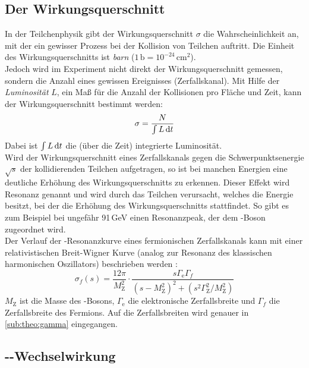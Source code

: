 \subsection{Der Wirkungsquerschnitt}
In der Teilchenphysik gibt der Wirkungsquerschnitt $\sigma$ die Wahrscheinlichkeit an, mit der ein gewisser Prozess bei der Kollision von 
Teilchen auftritt.
Die Einheit des Wirkungsquerschnitts ist \emph{barn} ($1\,\text{b} = 10^{-24}\,\text{cm}^2$). \\
Jedoch wird im Experiment nicht direkt der Wirkungsquerschnitt gemessen, sondern die Anzahl eines gewissen Ereignisses (Zerfallskanal). Mit Hilfe
der \emph{Luminosität} $L$, ein Maß für die Anzahl der Kollisionen pro Fläche und Zeit, kann der Wirkungsquerschnitt bestimmt werden:
\begin{equation}
    \sigma = \frac{N}{\int L \, \mathrm{d} t}
\end{equation}
Dabei ist $\int L \, \mathrm{d} t$ die (über die Zeit) integrierte Luminosität. \\
Wird der Wirkungsquerschnitt eines Zerfallskanals gegen die Schwerpunktsenergie $\sqrt{s}$ der kollidierenden Teilchen aufgetragen, so ist
bei manchen Energien eine deutliche Erhöhung des Wirkungsquerschnitts zu erkennen. Dieser Effekt wird Resonanz genannt und wird durch das Teilchen
verursacht, welches die Energie besitzt, bei der die Erhöhung des Wirkungsquerschnitts stattfindet.
So gibt es zum Beispiel bei ungefähr 91\,GeV einen Resonanzpeak, der dem \Z-Boson zugeordnet wird. \\
Der Verlauf der  \Z-Resonanzkurve eines fermionischen Zerfallskanals kann mit einer relativistischen Breit-Wigner Kurve (analog zur Resonanz des
klassischen harmonischen Oszillators) beschrieben werden \cite{manual}:
\begin{equation}
    \label{eq:sigma:fermion}
    \sigma_f(s) = \frac{12 \pi}{M_\text{Z}^2} \cdot \frac{s \Gamma_\text{e} \Gamma_f}{ \left( s - M_\text{Z}^2 \right)^2 + \left( s^2 \Gamma_\text{Z}^2 / M_\text{Z}^2 \right) }
\end{equation}
$M_\text{Z}$ ist die Masse des \Z-Bosons, $\Gamma_\text{e}$ die elektronische Zerfallsbreite und $\Gamma_f$ die Zerfallsbreite des Fermions. Auf
die Zerfallsbreiten wird genauer in \autoref{sub:theo:gamma} eingegangen.
\subsection{\texorpdfstring{\elp-\elm}{e+/e-}-Wechselwirkung}
